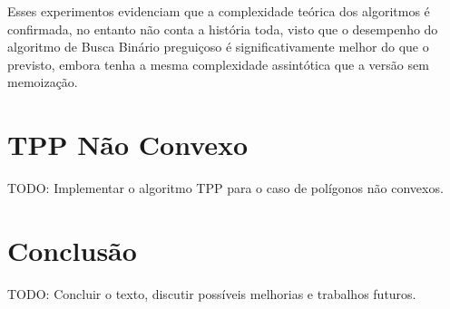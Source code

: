 \documentclass[11pt]{article}
\begin{document}
Esses experimentos evidenciam que a complexidade teórica dos algoritmos é confirmada, no entanto não conta a história toda, visto que o desempenho do algoritmo de Busca Binário preguiçoso é significativamente melhor do que o previsto, embora tenha a mesma complexidade assintótica que a versão sem memoização.

\section{TPP Não Convexo}
\label{sec:non-convex-tpp}

TODO: Implementar o algoritmo TPP para o caso de polígonos não convexos.

\section{Conclusão}
\label{sec:conclusion}

TODO: Concluir o texto, discutir possíveis melhorias e trabalhos futuros.




\end{document}
